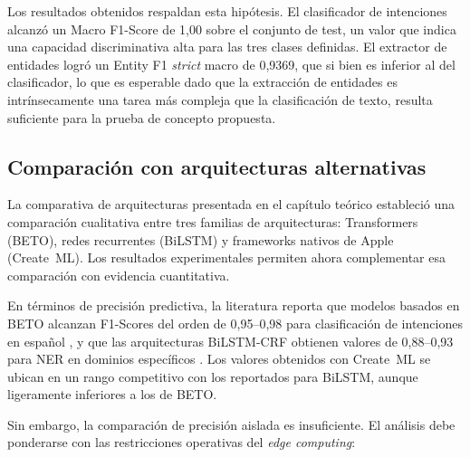 Los resultados obtenidos respaldan esta hipótesis. El clasificador de intenciones alcanzó un Macro F1-Score de 1,00 sobre el conjunto de test,
un valor que indica una capacidad discriminativa alta para las tres clases definidas. El extractor de entidades logró un Entity F1 \textit{strict} macro de 0,9369, que si bien es inferior al del clasificador, lo que es esperable dado que la extracción de entidades es intrínsecamente una tarea más compleja que la clasificación de texto, resulta suficiente para la prueba de concepto propuesta.

\subsection{Comparación con arquitecturas alternativas}
\label{subsec:comparacion-arquitecturas}

La comparativa de arquitecturas presentada en el capítulo teórico estableció una comparación cualitativa entre tres familias de
arquitecturas: Transformers (BETO), redes recurrentes (BiLSTM) y frameworks nativos de Apple (Create~ML). Los resultados experimentales permiten ahora complementar esa comparación con evidencia cuantitativa.

En términos de precisión predictiva, la literatura reporta que modelos basados en BETO alcanzan F1-Scores del orden de 0,95--0,98 para clasificación de
intenciones en español \citep{canete2020spanish}, y que las arquitecturas BiLSTM-CRF obtienen valores de 0,88--0,93 para NER en dominios específicos \citep{lample2016neural}. Los valores obtenidos con Create~ML se ubican en un rango competitivo con los reportados para BiLSTM, aunque ligeramente inferiores a los de BETO.

Sin embargo, la comparación de precisión aislada es insuficiente. El análisis debe ponderarse con las restricciones operativas del \textit{edge computing}:

